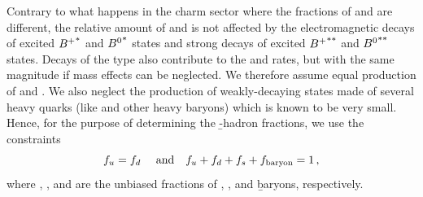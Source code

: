Contrary to what happens in the charm sector where the fractions of 
 and  are different, the relative amount 
of \Bu and \Bd is not affected by the electromagnetic decays of 
excited ${B^+}^*$ and ${B^0}^*$ states and strong decays of excited 
${B^+}^{**}$ and ${B^0}^{**}$ states. Decays of the type 
 also contribute to the \Bu and \Bd rates, 
but with the same magnitude if mass effects can be neglected.  
We therefore assume equal production of \Bu and \Bd. We also  
neglect the production of weakly-decaying states
made of several heavy quarks (like \Bc and other heavy baryons) 
which is known to be very small. Hence, for the purpose of determining 
the \b-hadron fractions, we use the constraints
\begin{equation}
\fBu = \fBd ~~~~\mbox{and}~~~ \fBu + \fBd + \fBs + \fbb = 1 \,,
\labe{constraints}
\end{equation}
where \fBu, \fBd, \fBs and \fbb
are the unbiased fractions of \Bu, \Bd, \Bs and \b baryons, respectively.

